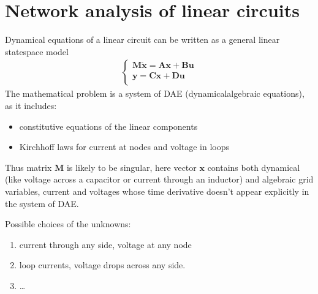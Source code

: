 \documentclass[letterpaper,10pt,italian]{jupyterBook}
\begin{document}
\section{Network analysis of linear circuits}
\label{\detokenize{ch/electrical-engineering-networks:network-analysis-of-linear-circuits}}\label{\detokenize{ch/electrical-engineering-networks:classical-electromagnetism-electrical-engineering-newtork-analysis}}\label{\detokenize{ch/electrical-engineering-networks::doc}}
\sphinxAtStartPar
Dynamical equations of a linear circuit can be written as a general linear state\sphinxhyphen{}space model
\begin{equation*}
\begin{split}\begin{cases}
  \mathbf{M} \dot{\mathbf{x}} = \mathbf{A} \mathbf{x} + \mathbf{B} \mathbf{u} \\
  \mathbf{y} = \mathbf{C} \mathbf{x} + \mathbf{D} \mathbf{u} \\
\end{cases}\end{split}
\end{equation*}
\sphinxAtStartPar
The mathematical problem is a system of DAE (dynamical\sphinxhyphen{}algebraic equations), as it includes:
\begin{itemize}
\item {} 
\sphinxAtStartPar
constitutive equations of the linear components

\item {} 
\sphinxAtStartPar
Kirchhoff laws for current at nodes and voltage in loops

\end{itemize}

\sphinxAtStartPar
Thus matrix \(\mathbf{M}\) is likely to be singular, here vector \(\mathbf{x}\) contains both dynamical (like voltage across a capacitor or current through an inductor) and algebraic grid variables, current and voltages whose time derivative doesn’t appear explicitly in the system of DAE.

\sphinxAtStartPar
{} Possible choices of the unknowns:
\begin{enumerate}
%
\item {} 
\sphinxAtStartPar
current through any side, voltage at any node

\item {} 
\sphinxAtStartPar
loop currents, voltage drops across any side.

\item {} 
\sphinxAtStartPar
… 

\end{enumerate}
\end{document}
